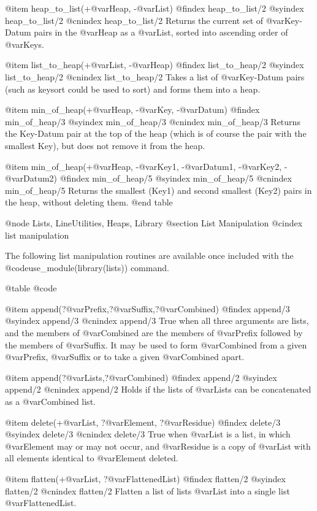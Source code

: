 {{{{{{{{{@item heap_to_list(+@var{Heap}, -@var{List})
@findex heap_to_list/2
@syindex        heap_to_list/2
@cnindex        heap_to_list/2
Returns the current set of @var{Key-Datum} pairs in the @var{Heap} as a
@var{List}, sorted into ascending order of @var{Keys}.

@item list_to_heap(+@var{List}, -@var{Heap})
@findex list_to_heap/2
@syindex        list_to_heap/2
@cnindex        list_to_heap/2
Takes a list of @var{Key-Datum} pairs (such as keysort could be used to sort)
and forms them into a heap.

@item min_of_heap(+@var{Heap},  -@var{Key},  -@var{Datum})
@findex min_of_heap/3
@syindex min_of_heap/3
@cnindex min_of_heap/3
Returns the Key-Datum pair at the top of the heap (which is of course
the pair with the smallest Key), but does not remove it from the heap.

@item min_of_heap(+@var{Heap},  -@var{Key1},  -@var{Datum1},
-@var{Key2},  -@var{Datum2})
@findex min_of_heap/5
@syindex min_of_heap/5
@cnindex min_of_heap/5
Returns the smallest (Key1) and second smallest (Key2) pairs in the
heap, without deleting them.
@end table

@node Lists, LineUtilities, Heaps, Library
@section List Manipulation
@cindex list manipulation

The following list manipulation routines are available once included
with the @code{use_module(library(lists))} command. 

@table @code

@item append(?@var{Prefix},?@var{Suffix},?@var{Combined})
@findex append/3
@syindex append/3
@cnindex append/3
True when all three arguments are lists, and the members of
@var{Combined} are the members of @var{Prefix} followed by the members of @var{Suffix}.
It may be used to form @var{Combined} from a given @var{Prefix}, @var{Suffix} or to take
a given @var{Combined} apart.

@item append(?@var{Lists},?@var{Combined})
@findex append/2
@syindex append/2
@cnindex append/2
Holds if the lists of @var{Lists} can be concatenated as a
@var{Combined} list.

@item delete(+@var{List}, ?@var{Element}, ?@var{Residue})
@findex delete/3
@syindex delete/3
@cnindex delete/3
True when @var{List} is a list, in which @var{Element} may or may not
occur, and @var{Residue} is a copy of @var{List} with all elements
identical to @var{Element} deleted.

@item flatten(+@var{List}, ?@var{FlattenedList})
@findex flatten/2
@syindex flatten/2
@cnindex flatten/2
Flatten a list of lists @var{List} into a single list
@var{FlattenedList}.

}}}}}}}}}
